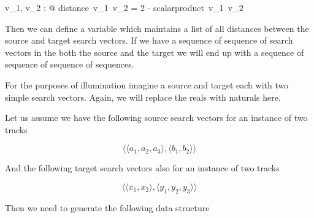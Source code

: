 \documentclass[11pt]{article}
\begin{document}
\begin{enumerate}
\begin{zed}
	\forall v_1, v_2 : \V @  distance~v_1~v_2 = 2 - scalarproduct~v_1~v_2		
\end{zed}

Then we can define a variable which maintains a list of all distances between the  source and target search vectors. If we have a sequence of sequence of search vectors in the both the source and the target we will end up with a sequence of sequence of sequence of sequences. 

For the purposes of illumination imagine a source and target each with two simple search vectors. Again, we will replace the reals with naturals here. 

Let us assume we have the following source search vectors for an instance of two tracks

\[ \langle \langle  a_1, a_2, a_3  \rangle, \langle b_1, b_2 \rangle \rangle \]

And the following target search vectors also for an instance of two tracks

\[ \langle \langle  x_1, x_2   \rangle, \langle y_1, y_2, y_3 \rangle \rangle \]
     
Then we need to generate the following data structure 


\end{enumerate}
\end{document}
